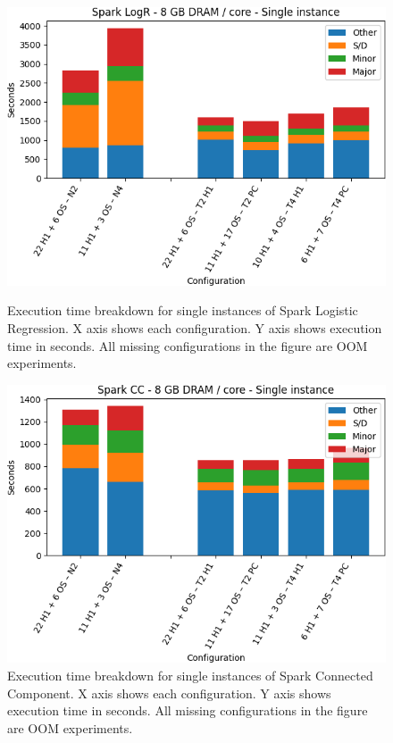 \begin{figure}[thbp]
        \centering
    \includegraphics[width=\linewidth]{./fig/logr64_single.png}
    \caption{Execution time breakdown for single instances of Spark
    Logistic Regression. X axis shows each configuration. Y axis shows execution time in seconds. All missing configurations in the figure are OOM experiments.}
    \label{fig:logr64_single}

    \includegraphics[width=\linewidth]{./fig/cc64_single.png}
    \caption{Execution time breakdown for single instances of Spark
    Connected Component. X axis shows each configuration.
Y axis shows execution time in seconds. All missing configurations in the figure are OOM experiments.}
    \label{fig:cc64_single}
\end{figure}
